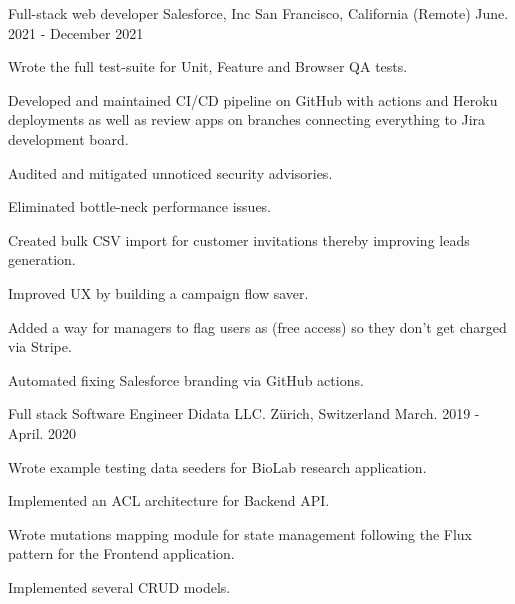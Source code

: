 \begin{cventries}
  \cventry
    {Full-stack web developer} %
    {Salesforce, Inc} %
    {San Francisco, California (Remote)} %
    {June. 2021 - December 2021} %
    {
      \begin{cvitems} %
        \item {Wrote the full test-suite for Unit, Feature and Browser QA tests.}
        \item {Developed and maintained CI/CD pipeline on GitHub with actions and Heroku deployments as well as review apps on branches connecting everything to Jira development board.}
        \item {Audited and mitigated unnoticed security advisories.}
        \item {Eliminated bottle-neck performance issues.}
        \item {Created bulk CSV import for customer invitations thereby improving leads generation.}
        \item {Improved UX by building a campaign flow saver.}
        \item {Added a way for managers to flag users as (free access) so they don't get charged via Stripe.}
        \item {Automated fixing Salesforce branding via GitHub actions.}
      \end{cvitems}
     }

  \cventry
    {Full stack Software Engineer} %
    {Didata LLC.} %
    {Zürich, Switzerland} %
    {March. 2019 - April. 2020} %
    {
      \begin{cvitems} %
        \item {Wrote example testing data seeders for BioLab research application.}
        \item {Implemented an ACL architecture for Backend API.}
        \item {Wrote mutations mapping module for state management following the Flux pattern for the Frontend application.}
        \item {Implemented several CRUD models.}
      \end{cvitems}
    }

\end{cventries}
